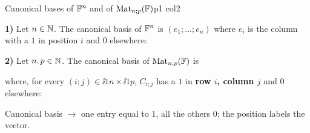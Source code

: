 \documentclass[sheet,noautoquant,noautokw]{neyvia-study}
\begin{document}
\begin{concept}[1.18]{Canonical bases of $\mathbb{F}^n$ and of $\operatorname{Mat}_{n;p}(\mathbb{F})$}{p1 col2}
\begin{definition}
\noindent \textbf{1)} Let $n\in\mathbb{N}$. The canonical basis of $\mathbb{F}^n$ is $(e_1;\dots;e_n)$ where $e_i$ is the column with a $1$ in position $i$ and $0$ elsewhere:
\par\noindent \textbf{2)} Let $n,p\in\mathbb{N}$. The canonical basis of $\operatorname{Mat}_{n;p}(\mathbb{F})$ is
\par\noindent where, for every $(i;j)\in\ii{1}{n}\times\ii{1}{p}$, $C_{i;j}$ has a $1$ in \textbf{row $i$, column $j$} and $0$ elsewhere:
\end{definition}
\begin{reflex}
Canonical basis \ensuremath{\rightarrow} one entry equal to $1$, all the others $0$; the position labels the vector.
\end{reflex}
\end{concept}
\end{document}
